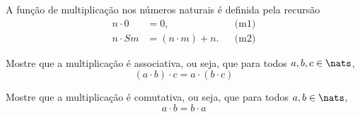 \begin{definition}[Multiplicação]
	A função de multiplicação nos números naturais é definida pela recursão
	$$
		\begin{aligned}
			n \cdot 0 &= 0, && \text{(m1)}\\
			n \cdot Sm &= (n \cdot m) + n. && \text{(m2)}
		\end{aligned}
	$$
\end{definition}

\begin{exercise}
    Mostre que a multiplicação é associativa, ou seja, que para todos $a,b,c \in \nats$,
    $$
        (a \cdot b) \cdot c = a \cdot (b \cdot c)
    $$
\end{exercise}

\begin{exercise}
    Mostre que a multiplicação é comutativa, ou seja, que para todos $a,b \in \nats$,
    $$
        a \cdot b = b \cdot a
    $$
\end{exercise}
